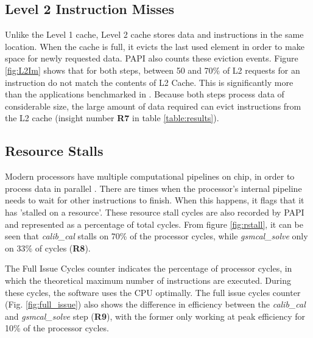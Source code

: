 \subsection{Level 2 Instruction Misses}

Unlike the Level 1 cache, Level 2  cache stores data and instructions in the same location. When the cache is full, it evicts the last used element in order to make space for newly requested data. PAPI also counts these eviction events. 
Figure \ref{fig:L2Im} shows that for both steps, between 50 and 70\% of L2 requests for an instruction do not match the contents of L2 Cache. This is significantly more than the applications benchmarked in \citep[Table 2]{cache_misses}. Because both steps process data of considerable size, the large amount of data required can evict instructions from the L2 cache (insight number \textbf{R7} in table \ref{table:results}). 

\subsection{Resource Stalls}

Modern processors have multiple computational pipelines on chip, in order to process data in parallel \citep{pipeline_x86}. There are times when the processor's internal pipeline needs to wait for other instructions to finish. When this happens, it flags that it has 'stalled on a resource'. These resource stall cycles are also recorded by PAPI and represented as a percentage of total cycles. From figure \ref{fig:rstall}, it can be seen that \textit{calib\_cal} stalls on 70\% of the processor cycles, while  \textit{gsmcal\_solve} only on 33\% of cycles (\textbf{R8}). 

The Full Issue Cycles counter indicates the percentage of processor cycles, in which the theoretical maximum number of instructions are executed. During these cycles, the software uses the CPU optimally. The full issue cycles counter (Fig. \ref{fig:full_issue}) also shows the difference in efficiency between the \textit{calib\_cal} and \textit{gsmcal\_solve} step  (\textbf{R9}), with the former only working at peak efficiency for 10\% of the processor cycles.

